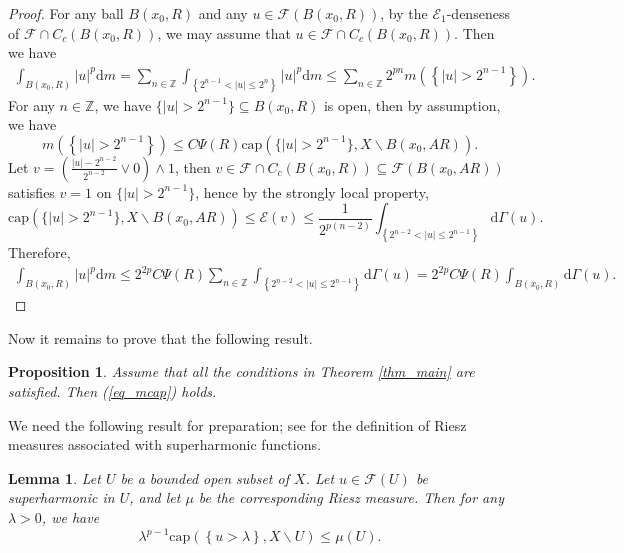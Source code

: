 \documentclass[11pt,a4paper]{article}
\numberwithin{equation}{section}
\theoremstyle{plain}
\newtheorem{proposition}[theorem]{Proposition}
\newtheorem{lemma}[theorem]{Lemma}
\theoremstyle{definition}
\begin{document}
\begin{proof}
For any ball $B(x_0,R)$ and any $u\in \mathcal{F}(B(x_0,R))$, by the $\mathcal{E}_1$-denseness of $\mathcal{F}\cap C_c(B(x_0,R))$, we may assume that $u\in \mathcal{F}\cap C_c(B(x_0,R))$. Then we have
\begin{align*}
\int_{B(x_0,R)}\lvert u\rvert^p \mathrm{d}m=\sum_{n\in \mathbb{Z}}\int_{\left\{2^{n-1}<\lvert u\rvert\le 2^n\right\}}\lvert u\rvert^p \mathrm{d}m\le \sum_{n\in \mathbb{Z}}2^{pn} m \left(\left\{\lvert u\rvert>2^{n-1}\right\}\right).
\end{align*}
For any $n\in \mathbb{Z}$, we have $\{\lvert u\rvert>2^{n-1}\}\subseteq B(x_0,R)$ is open, then by assumption, we have
$$m \left(\left\{\lvert u\rvert>2^{n-1}\right\}\right)\le C\Psi(R)\mathrm{cap}\left(\{\lvert u\rvert>2^{n-1}\},X\backslash B(x_0,AR)\right).$$
Let $v=\left(\frac{\lvert u\rvert-2^{n-2}}{2^{n-2}}\vee0\right)\wedge 1$, then $v\in \mathcal{F}\cap C_c(B(x_0,R))\subseteq \mathcal{F}(B(x_0,AR))$ satisfies $v=1$ on $\{\lvert u\rvert>2^{n-1}\}$, hence by the strongly local property,
$$\mathrm{cap}\left(\{\lvert u\rvert>2^{n-1}\},X\backslash B(x_0,AR)\right)\le \mathcal{E}(v)\le \frac{1}{2^{p(n-2)}}\int_{\left\{2^{n-2}<\lvert u\rvert\le 2^{n-1}\right\}}\mathrm{d}\Gamma(u).$$
Therefore,
\begin{align*}
\int_{B(x_0,R)}\lvert u\rvert^p \mathrm{d}m\le 2^{2p}C\Psi(R)\sum_{n\in \mathbb{Z}}\int_{\left\{2^{n-2}<\lvert u\rvert\le 2^{n-1}\right\}}\mathrm{d}\Gamma(u)=2^{2p}C\Psi(R)\int_{B(x_0,R)}\mathrm{d}\Gamma(u).
\end{align*}
\end{proof}

Now it remains to prove that the following result.

\begin{proposition}\label{prop_mcap}
Assume that all the conditions in Theorem \ref{thm_main} are satisfied. Then (\ref{eq_mcap}) holds.
\end{proposition}

We need the following result for preparation; see \cite[Proposition 3.3]{Yan25d} for the definition of Riesz measures associated with superharmonic functions.

\begin{lemma}\label{lem_lambda}
Let $U$ be a bounded open subset of $X$. Let $u\in\mathcal{F}(U)$ be superharmonic in $U$, and let $\mu$ be the corresponding Riesz measure. Then for any $\lambda>0$, we have
$$\lambda^{p-1}\mathrm{cap}\left(\left\{u>\lambda\right\},X\backslash U\right)\le \mu(U).$$
\end{lemma}
\end{document}
